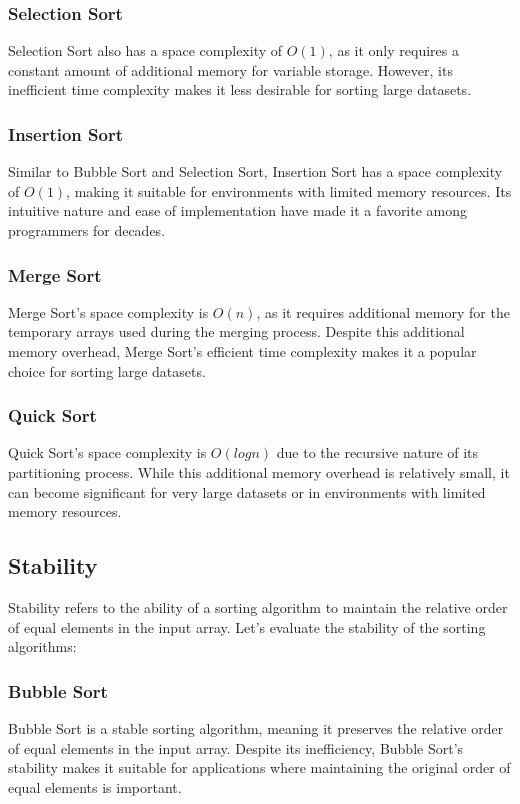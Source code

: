\documentclass{article}
\begin{document}
\subsubsection{Selection Sort}
Selection Sort also has a space complexity of \(O(1)\), as it only requires a constant amount of additional memory for variable storage. However, its inefficient time complexity makes it less desirable for sorting large datasets.

\subsubsection{Insertion Sort}
Similar to Bubble Sort and Selection Sort, Insertion Sort has a space complexity of \(O(1)\), making it suitable for environments with limited memory resources. Its intuitive nature and ease of implementation have made it a favorite among programmers for decades.

\subsubsection{Merge Sort}
Merge Sort's space complexity is \(O(n)\), as it requires additional memory for the temporary arrays used during the merging process. Despite this additional memory overhead, Merge Sort's efficient time complexity makes it a popular choice for sorting large datasets.

\subsubsection{Quick Sort}
Quick Sort's space complexity is \(O(log n)\) due to the recursive nature of its partitioning process. While this additional memory overhead is relatively small, it can become significant for very large datasets or in environments with limited memory resources.

\subsection{Stability}
Stability refers to the ability of a sorting algorithm to maintain the relative order of equal elements in the input array. Let's evaluate the stability of the sorting algorithms:

\subsubsection{Bubble Sort}
Bubble Sort is a stable sorting algorithm, meaning it preserves the relative order of equal elements in the input array. Despite its inefficiency, Bubble Sort's stability makes it suitable for applications where maintaining the original order of equal elements is important.
\end{document}
